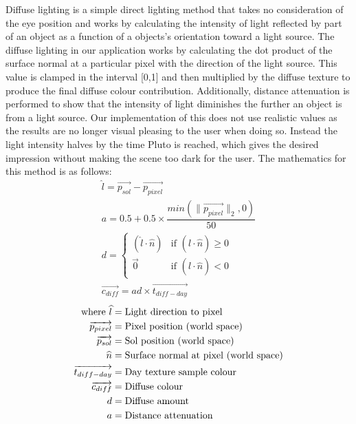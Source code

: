 Diffuse lighting is a simple direct lighting method that takes no consideration of the eye position and works by calculating the intensity of light reflected by part of an object as a function of a objects's orientation toward a light source.
The diffuse lighting in our application works by calculating the dot product of the surface normal at a particular pixel with the direction of the light source. This value is clamped in the interval [0,1] and then multiplied by the diffuse texture to produce the final diffuse colour contribution.
Additionally, distance attenuation is performed to show that the intensity of light diminishes the further an object is from a light source. Our implementation of this does not use realistic values as the results are no longer visual pleasing to the user when doing so. Instead the light intensity halves by the time Pluto is reached, which gives the desired impression without making the scene too dark for the user.
The mathematics for this method is as follows:
\vspace{-10pt} 
\begin{align}
\widehat{l} = \overrightarrow{p_{sol}}-\overrightarrow{p_{pixel}} \\
a = 0.5+0.5\times \dfrac{min(\|\overrightarrow{p_{pixel}}\|_2, 0)}{50}  \\
d = \begin{cases} (\widehat{l} \cdot \widehat{n})  &\mbox{if } (\widehat{l} \cdot \widehat{n}) \ge 0 \\ 
\overrightarrow{0} & \mbox{if } (\widehat{l} \cdot \widehat{n}) < 0 \end{cases} \\
\overrightarrow{c_{diff}} = ad \times \overrightarrow{t_{diff-day}}
\end{align}
\vspace{-40pt} 
\begin{align*}
\text{where}~
\widehat{l} &= \text{Light direction to pixel} \notag\\
\overrightarrow{p_{pixel}} &= \text{Pixel position (world space)} \notag\\
\overrightarrow{p_{sol}} &= \text{Sol position (world space)} \notag\\
\widehat{n} &= \text{Surface normal at pixel (world space)} \notag\\
\overrightarrow{t_{diff-day}} &= \text{Day texture sample colour} \notag\\
\overrightarrow{c_{diff}} &= \text{Diffuse colour} \notag\\
d &= \text{Diffuse amount} \notag\\
a  &= \text{Distance attenuation} \notag\\
\end{align*}
\vspace{-45pt}

